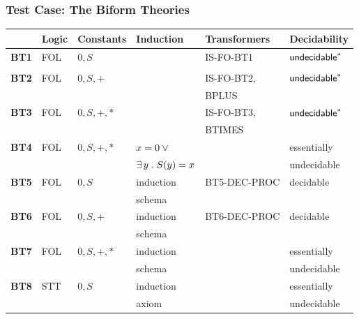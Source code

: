 \documentclass[t,12pt,numbers,fleqn]{beamer}
\begin{document}
\begin{frame}
\frametitle{Test Case: The Biform Theories}
\vspace{-2ex}
\footnotesize
\bc
\begin{tabular}{|l|l|l|l|l|l|}
\hline
& \textbf{Logic} & \textbf{Constants} & \textbf{Induction} & \textbf{Transformers} & \textbf{Decidability} \\ \hline \hline
\textbf{BT1} & FOL & $0,S$ & & IS-FO-BT1 & ${\sf undecidable}^*$\\ 
  & & & & & \\\hline
\textbf{BT2} & FOL & $0,S,+$ & & IS-FO-BT2, & ${\sf undecidable}^*$\\  
  & & & & BPLUS & \\\hline
\textbf{BT3} & FOL & $0,S,+,*$ & & IS-FO-BT3, & ${\sf undecidable}^*$\\  
  & & & & BTIMES & \\\hline
\textbf{BT4} & FOL & $0,S,+,*$ & $x = 0 \vee {}$ & & essentially\\  
  & & & $\exists\, y \mathrel. S(y) = x$ & & undecidable\\\hline
\textbf{BT5} & FOL & $0,S$ & induction & BT5-DEC-PROC & decidable\\  
  & & & schema & & \\\hline
\textbf{BT6} & FOL & $0,S,+$ & induction & BT6-DEC-PROC & decidable\\  
  & & & schema & & \\\hline
\textbf{BT7} & FOL & $0,S,+,*$ & induction &   & essentially \\  
  & & & schema & & undecidable\\\hline
\textbf{BT8} & STT & $0,S$ & induction & & essentially \\  
  & & & axiom & & undecidable\\\hline
\end{tabular}
\ec
\end{frame}

\end{document}
